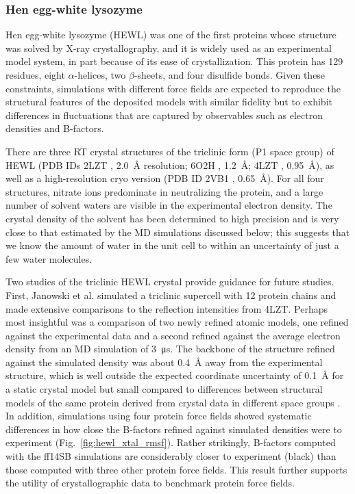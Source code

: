 \documentclass[9pt,review,pubversion]{livecoms}
\begin{document}
\subsubsection{Hen egg-white lysozyme}
\label{sub2:hewl}

Hen egg-white lysozyme (HEWL) was one of the first proteins whose structure was solved by X-ray crystallography, and it is widely used as an experimental model system, in part because of its ease of crystallization.
This protein has 129 residues, eight $\alpha$-helices, two $\beta$-sheets, and four disulfide bonds.
Given these constraints, simulations with different force fields are expected to reproduce the structural features of the deposited models with similar fidelity but to exhibit differences in fluctuations that are captured by observables such as electron densities and B-factors.

There are three RT crystal structures of the triclinic form (P1 space group) of HEWL (PDB IDs 2LZT \cite{ramanadham_refinement_1990}, \qty{2.0}{\angstrom} resolution; 6O2H \cite{meisburger_diffuse_2020}, \qty{1.2}{\angstrom}; 4LZT \cite{walsh_refinement_1998}, \qty{0.95}{\angstrom}), as well as a high-resolution cryo version (PDB ID 2VB1 \cite{wang_triclinic_2007}, \qty{0.65}{\angstrom}).
For all four structures, nitrate ions predominate in neutralizing the protein, and a large number of solvent waters are visible in the experimental electron density.
The crystal density of the solvent has been determined to high precision \cite{moreau_ice_2020} and is very close to that estimated by the MD simulations discussed below; this suggests that we know the amount of water in the unit cell to within an uncertainty of just a few water molecules. 

Two studies of the triclinic HEWL crystal provide guidance for future studies.
First, Janowski et al. \cite{janowski_molecular_2016} simulated a triclinic supercell with 12 protein chains and made extensive comparisons to the reflection intensities from 4LZT.
Perhaps most insightful was a comparison of two newly refined atomic models, one refined against the experimental data and a second refined against the average electron density from an MD simulation of \qty{3}{\micro\second}.
The backbone of the structure refined against the simulated density was about \qty{0.4}{\angstrom} away from the experimental structure, which is well outside the expected coordinate uncertainty of \qty{0.1}{\angstrom} for a static crystal model but small compared to differences between structural models of the same protein derived from crystal data in different space groups \cite{kovalevskiy_alphafold_2024}.
In addition, simulations using four protein force fields showed systematic differences in how close the B-factors refined against simulated densities were to experiment (Fig.~\ref{fig:hewl_xtal_rmsf}). Rather strikingly, B-factors computed with the ff14SB simulations are considerably closer to experiment (black) than those computed with three other protein force fields. This result further supports the utility of crystallographic data to benchmark protein force fields.
\end{document}
